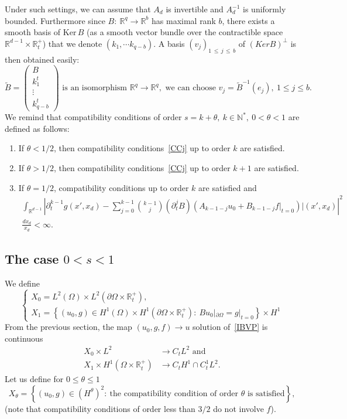 \documentclass[AHL,Unicode,longabstracts,published]{cedram}
\newcommand{\R}{\mathbb{R}}
\newcommand{\N}{\mathbb{N}}
\newcommand{\Ker}{\mathrm{Ker}}
\newcommand{\N}{\mathbb{N}}
\begin{document}
Under such settings, we can assume that $A_d$ is invertible and $A_d^{-1}$ is uniformly bounded. Furthermore since $B:\ \R^q\to
\R^b$ has maximal rank $b$, there exists a smooth basis of $\Ker\,B$ (as a smooth vector bundle over the contractible space $\R^{d-1}\times \R_t^+$) that we denote $(k_1,\cdots k_{q-b})$. A basis $(v_j)_{1\,\leq\,j\,\leq\,b}$ of $(Ker B)^\perp$ is then obtained easily:
\[
\widetilde{B}=
\begin{pmatrix}
B\\
k_1^t\\
\vdots\\
k_{q-b}^t
\end{pmatrix}\text{ is an isomorphism }
\R^q\to \R^q,\text{ we can choose }
v_j=\widetilde{B}^{-1}(e_j),\ 1\leq j\leq b.
\]
We remind that compatibility conditions of order $s=k+\theta,\ k\in \N^*,\ 0<\theta<1$ are defined as follows:
\begin{enumerate}
\item If $\theta <1/2$, then compatibility conditions~\eqref{CCj} up to order $k$ are satisfied.
\item If $\theta>1/2$, then compatibility conditions~\eqref{CCj} up to order $k+1$ are satisfied.
\item If $\theta=1/2$, compatibility conditions up to order $k$ are satisfied and
\begin{multline*}
\int_{\R^{d-1}} \left|\partial_t^{k-1} g(x',x_d)-\sum_{j=0}^{k-1} \binom{k-1}{j}\left(\partial_t^jB\right)\left(A_{k-1-j}u_0+B_{k-1-j}f|_{t=0}\right)|(x',x_d)\right|^2\\
\frac{dx_d}{x_d}<\infty.
\end{multline*}
\end{enumerate}


\subsection{The case $0<s<1$} 
We define
\[
\left\{
\begin{array}{ll}
X_0=L^2(\Omega)\times L^2\left(\partial\Omega\times \R_t^+\right),\\
X_1=\left\{(u_0,g)\in H^1(\Omega)\times H^1\left(\partial\Omega\times \R_t^+\right):
\ Bu_0|_{\partial\Omega}=g|_{t=0}\right\}\times H^1
\end{array}
\right.
\]
From the previous section, the map $(u_0,g,f)\to u$ solution of~\eqref{IBVP} is continuous
\begin{align*}
X_0\times L^2&\to C_tL^2\text{ and }\\
X_1\times H^1\left(\Omega\times \R_t^+\right)&\to C_tH^1\cap C^1_tL^2.
\end{align*}
Let us define for $0\leq\theta \leq 1$
\[
X_\theta=\left\{(u_0,g)\in \left(H^\theta\right)^2:\ \text{the compatibility condition of order }\theta\text{ is satisfied}\right\},
\]
(note that compatibility conditions of order less than $3/2$ do not involve $f$).
\end{document}
